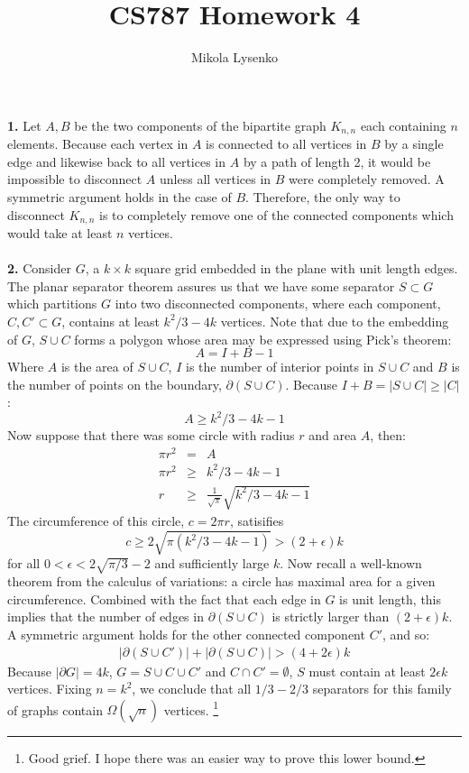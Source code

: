 \documentclass{article}
\title{CS787 Homework 4}
\author{Mikola Lysenko}
\begin{document}
\maketitle{}

\paragraph{} \textbf{1.}
Let $A, B$ be the two components of the bipartite graph $K_{n,n}$ each containing $n$ elements.  Because each vertex in $A$ is connected to all vertices in $B$ by a single edge and likewise back to all vertices in $A$ by a path of length 2, it would be impossible to disconnect $A$ unless all vertices in $B$ were completely removed.  A symmetric argument holds in the case of $B$.  Therefore, the only way to disconnect $K_{n,n}$ is to completely remove one of the connected components which would take at least $n$ vertices.

\paragraph{} \textbf{2.}
Consider $G$, a $k \times k$ square grid embedded in the plane with unit length edges.  The planar separator theorem assures us that we have some separator $S \subset G$ which partitions $G$ into two disconnected components, where each component, $C,C' \subset G$, contains at least $k^2/3 - 4k$ vertices.  Note that due to the embedding of $G$, $S \cup C$ forms a polygon whose area may be expressed using Pick's theorem:
\[ A = I + B - 1 \]
Where $A$ is the area of $S \cup C$, $I$ is the number of interior points in $S \cup C$ and $B$ is the number of points on the boundary, $\partial(S \cup C)$.  Because $I + B = |S \cup C| \geq |C|$:
\[ A \geq k^2/3 - 4k - 1 \]
Now suppose that there was some circle with radius $r$ and area $A$, then:
\begin{eqnarray*}
\pi r^2 & = & A \\
\pi r^2 & \geq & k^2/3 - 4k -1 \\
r & \geq & \frac{1}{\sqrt{\pi}}\sqrt{k^2/3 - 4k - 1}
\end{eqnarray*}
The circumference of this circle, $c=2 \pi r$, satisifies
\[ c \geq 2 \sqrt{\pi(k^2/3 - 4k - 1)} > (2 + \epsilon) k \]
for all $0 < \epsilon < 2 \sqrt{\pi / 3} - 2$ and sufficiently large $k$.  Now recall a well-known theorem from the calculus of variations: a circle has maximal area for a given circumference.  Combined with the fact that each edge in $G$ is unit length, this implies that the number of edges in $\partial(S \cup C)$ is strictly larger than $(2 + \epsilon)k$.  A symmetric argument holds for the other connected component $C'$, and so:
\begin{eqnarray*}
|\partial(S \cup C')| + |\partial(S \cup C)| > (4 + 2 \epsilon) k
\end{eqnarray*}
Because $|\partial G| = 4k$, $G = S \cup C \cup C'$ and $C \cap C' = \emptyset$, $S$ must contain at least $2 \epsilon k$ vertices.  Fixing $n = k^2$, we conclude that all $1/3-2/3$ separators for this family of graphs contain $\Omega(\sqrt{n})$ vertices. \footnote{Good grief.  I hope there was an easier way to prove this lower bound.}
\end{document}
